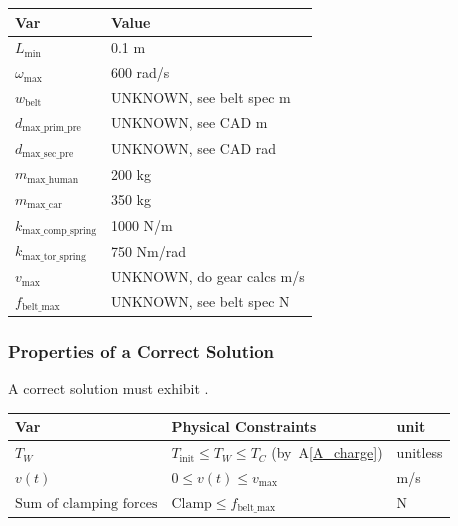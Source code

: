 \documentclass[12pt]{article}
\newcommand{\aref}[1]{A\ref{#1}}
\begin{document}
\begin{table}[!h]
\caption{Specification Parameter Values} \label{TblSpecParams}
\renewcommand{\arraystretch}{1.2}
\noindent \begin{longtable*}{l l} 
  \toprule
  \textbf{Var} & \textbf{Value} \\
  \midrule 
  $L_\text{min}$ & 0.1 \si{\metre}\\
  $\omega_\text{max}$ & 600 rad/s\\
  $w_\text{belt}$ & UNKNOWN, see belt spec m\\
  $d_\text{max\_prim\_pre}$ & UNKNOWN, see CAD m\\
  $d_\text{max\_sec\_pre}$ & UNKNOWN, see CAD rad\\
  $m_\text{max\_human}$ & 200 kg\\
  $m_\text{max\_car}$ & 350 kg\\
  $k_\text{max\_comp\_spring}$ & 1000 N/m\\
  $k_\text{max\_tor\_spring}$ & 750 Nm/rad\\
  $v_\text{max}$ & UNKNOWN, do gear calcs m/s\\
  $f_\text{belt\_max}$ & UNKNOWN, see belt spec N\\
  \bottomrule
\end{longtable*}
\end{table}

\subsubsection{Properties of a Correct Solution} \label{sec_CorrectSolution}

\noindent
A correct solution must exhibit .  

\begin{table}[!h]
\caption{Output Variables} \label{TblOutputVar}
\renewcommand{\arraystretch}{1.2}
\noindent \begin{longtable*}{l l l} 
  \toprule
  \textbf{Var} & \textbf{Physical Constraints} & \textbf{unit}\\
  \midrule 
  $T_W$ & $T_\text{init} \leq T_W \leq T_C$ (by~\aref{A_charge}) & unitless\\
  $v(t)$ & $0 \leq v(t) \leq v_\text{max}$& m/s\\
  $\text{Sum of clamping forces}$ & $\text{Clamp} \leq f_\text{belt\_max}$ & N \\
  \bottomrule
\end{longtable*}
\end{table}
\end{document}

